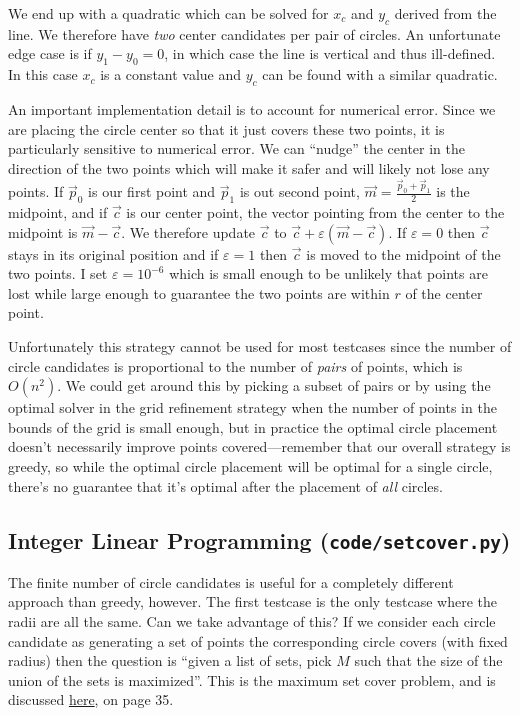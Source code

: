 \documentclass[11pt, oneside]{article}
\begin{document}
We end up with a quadratic which can be solved for \( x_c \) and \( y_c \)
derived from the line. We therefore have \textit{two} center candidates per
pair of circles. An unfortunate edge case is if \( y_1 - y_0 = 0 \), in which
case the line is vertical and thus ill-defined. In this case \( x_c \) is a
constant value and \( y_c \) can be found with a similar quadratic.

An important implementation detail is to account for numerical error. Since we
are placing the circle center so that it just covers these two points, it is
particularly sensitive to numerical error. We can \enquote{nudge} the center
in the direction of the two points which will make it safer and will likely
not lose any points. If \( \vec{p}_0 \) is our first point and \( \vec{p}_1 \)
is out second point, \( \vec{m} = \frac{\vec{p}_0 + \vec{p}_1}{2} \) is the
midpoint, and if \( \vec{c} \) is our center point, the vector pointing from
the center to the midpoint is \( \vec{m} - \vec{c} \). We therefore update \(
\vec{c} \) to \( \vec{c} + \varepsilon(\vec{m} - \vec{c}) \). If \( \varepsilon
= 0 \) then \( \vec{c} \) stays in its original position and if \( \varepsilon
= 1 \) then \( \vec{c} \) is moved to the midpoint of the two points. I set \(
\varepsilon = 10^{-6} \) which is small enough to be unlikely that points are
lost while large enough to guarantee the two points are within \( r \) of the
center point.

Unfortunately this strategy cannot be used for most testcases since the number
of circle candidates is proportional to the number of \textit{pairs} of points,
which is \( O(n^2) \). We could get around this by picking a subset of pairs or
by using the optimal solver in the grid refinement strategy when the number of
points in the bounds of the grid is small enough, but in practice the optimal
circle placement doesn't necessarily improve points covered---remember that
our overall strategy is greedy, so while the optimal circle placement will be
optimal for a single circle, there's no guarantee that it's optimal after the
placement of \textit{all} circles.

\subsection{Integer Linear Programming (\texttt{code/setcover.py})}
The finite number of circle candidates is useful for a completely
different approach than greedy, however. The first testcase is the only
testcase where the radii are all the same. Can we take advantage of this?
If we consider each circle candidate as generating a set of points the 
corresponding circle covers (with fixed radius) then the question is \enquote{given
a list of sets, pick \( M \) such that the size of the union of the sets is maximized}.
This is the maximum set cover problem, and is discussed
\href{https://github.com/stephen-huan/cs-lectures/blob/master/probability-theory/gacha-optimization/writeup.pdf}
{here}, on page 35.
\end{document}
